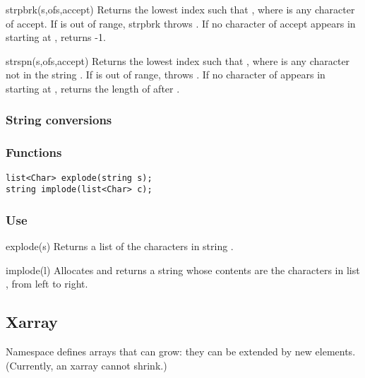 \begin{defun}{strpbrk}{(s,ofs,accept)}
Returns the lowest index  such that
, where  is any character of
accept.  If  is out of range, strpbrk throws
.  If no character of accept
appears in  starting at ,  returns -1.
\end{defun}

\begin{defun}{strspn}{(s,ofs,accept)}
Returns the lowest index  such that
, where  is any character not
in the string .  If  is out of range, 
throws .  If no character of
 appears in  starting at , 
returns the length of  after .
\end{defun}


\subsubsection*{String conversions}
\subsubsection*{Functions}
\begin{verbatim}
list<Char> explode(string s);
string implode(list<Char> c);
\end{verbatim}

\subsubsection*{Use}

\begin{defun}{explode}{(s)}
Returns a list of the characters in string .
\end{defun}

\begin{defun}{implode}{(l)}
Allocates and returns a string whose contents are the characters in list
, from left to right.
\end{defun}

\subsection{Xarray}

Namespace  defines arrays that can grow: they can be
extended by new elements.  (Currently, an xarray cannot shrink.)

